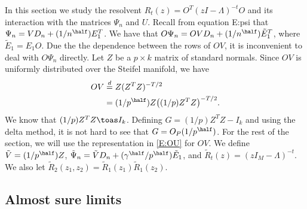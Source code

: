 In this section we study the resolvent $R_t(z) = O^T (z I - \Lambda)^{-t} O$ 
and its interaction with the matrices $\Psi_n$ and $U$.  Recall from equation
{E:psi} that $\Psi_n = V D_n + (1/n^{\half}) E_1^T$.  We have that
$O \Psi_n = O V D_n + (1/n^{\half}) \tilde E_1^T$, where $\tilde E_1 = E_1 O$.
Due the the dependence between the rows of $O V$, it is inconvenient to
deal with $O \Psi_n$ directly.  Let $Z$ be a $p \times k$ matrix of \iid standard normals.  Since $O V$ is uniformly distributed over the Steifel manifold, we have
\begin{align}\label{E:OU}
    O V
        &\overset{d}{=} Z (Z^T Z)^{-T/2}  \notag \\
        &= (1/p^\half) Z \big((1/p) Z^T Z\big)^{-T/2}.  
\end{align}    
We know that
$(1/p) Z^T Z \toas I_k$.  Defining $G = (1/p) Z^T Z - I_k$ and using the
delta method, it is not hard to see that $G = O_P(1/p^\half)$.  For the rest
of the section, we will use the representation in \eqref{E:OU} for $OV$.  We
define $\tilde V = (1/p^\half) Z$,
$\tilde \Psi_n =  \tilde V D_n + (\gamma^{\half} / p^\half) \tilde E_1$,
and $\tilde R_t (z) = (z I_M - \Lambda)^{-t}$.  We also let 
$\tilde R_2(z_1, z_2) = \tilde R_1 (z_1) \tilde R_1 (z_2)$.


\subsection{Almost sure limits}

